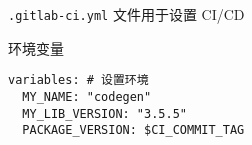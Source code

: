 
\verb`.gitlab-ci.yml` 文件用于设置 CI/CD

环境变量
\begin{lstlisting}[language=none]
variables: # 设置环境
  MY_NAME: "codegen"
  MY_LIB_VERSION: "3.5.5"
  PACKAGE_VERSION: $CI_COMMIT_TAG
\end{lstlisting}
